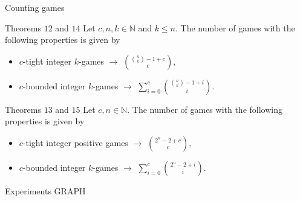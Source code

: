 \documentclass{beamer}
\begin{document}
\begin{frame}{Counting games}
    \begin{block}{Theorems $12$ and $14$}
        Let $c, n, k \in \mathbb{N}$ and $k \leq n$.
        The number of games with the following properties is given by

        \begin{itemize}
            \item $c$-tight integer $k$-games $\rightarrow$ $\binom{\binom{n}{k}-1+c}{c},$
            \item $c$-bounded integer $k$-games $\rightarrow$ $\sum_{i=0}^{c}\binom{\binom{n}{k}-1+i}{i}.$
        \end{itemize}
    \end{block}

    \begin{block}{Theorems $13$ and $15$}
        Let $c, n \in \mathbb{N}$.
        The number of games with the following properties is given by

        \begin{itemize}
            \item $c$-tight integer positive games $\rightarrow$ $\binom{2^{n}-2+c}{c},$
            \item $c$-bounded integer $k$-games $\rightarrow$ $\sum_{i=0}^{c}\binom{2^{n}-2+i}{i}.$
        \end{itemize}
    \end{block}
\end{frame}



\begin{frame}{Experiments}
    GRAPH
\end{frame}


\end{document}
